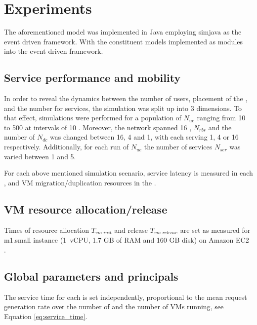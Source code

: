 \section{Experiments}
The aforementioned model was implemented in Java employing simjava \cite{SimJava} as the event driven framework. With the constituent models implemented as modules into the event driven framework.

\subsection{Service performance and mobility}
In order to reveal the dynamics between the number of users, placement of the \dcs{}, and the number for services, the simulation was split up into 3 dimensions.
To that effect, simulations were performed for a population of \ues{} $N_{ue}$ ranging from 10 to 500 \ues{} at intervals of 10 \ues{}.
Moreover, the network spanned 16 \rbss{}, $N_{rbs}$ and the number of \dcs{} $N_{dc}$ was changed between 16, 4 and 1, with each \dc{} serving 1, 4 or 16 \rbss{} respectively.
Additionally, for each run of $N_{ue}$ the number of services $N_{ser}$ was varied between 1 and 5.

For each above mentioned simulation scenario, service latency is measured in each \ue{}, and VM migration/duplication resources in the \dc{}.

\subsection{VM resource allocation/release}
Times of resource allocation $T_{vm\_init}$ and release $T_{vm\_release}$ are set as measured for m1.small instance (1~vCPU, 1.7 GB of RAM and 160 GB disk) on Amazon EC2 \cite{5719609}. %


\subsection{Global parameters and principals}
The service time for each \dc{} is set independently, proportional to the mean request generation rate over the number of \rbss{} and the number of VMs running, see Equation \ref{eq:service_time}.

